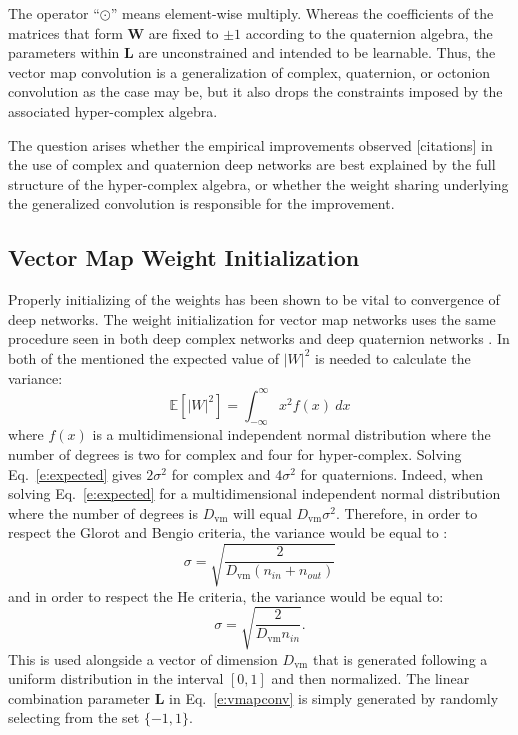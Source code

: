 \documentclass[14pt,a4paper]{article}
\begin{document}
\noindent
The operator ``$\odot$'' means element-wise multiply.
Whereas the coefficients of the matrices that form $\mathbf{W}$ are fixed to $\pm1$ according to the quaternion algebra,
the parameters within $\mathbf{L}$ are unconstrained and intended to be learnable.
Thus, the vector map convolution is a generalization of complex, quaternion, or octonion convolution as the case may be,
but it also drops the constraints imposed by the associated hyper-complex algebra.

The question arises whether the empirical improvements observed [citations] in the use of complex and quaternion deep networks are best explained by the full structure of the hyper-complex algebra, or whether the weight sharing underlying the generalized
convolution is responsible for the improvement.

\subsection{Vector Map Weight Initialization}
Properly initializing of the weights has been shown to be vital to convergence of deep networks.
The weight initialization for vector map networks uses the same procedure seen in both deep complex networks \cite{trabelsi+al-2018-complexconv} and deep quaternion networks \cite{Gaudet2018}.
In both of the mentioned the expected value of $|W|^2$ is needed to calculate the variance:
\begin{equation}
\mathbb{E}[|W|^2] = \int_{-\infty}^\infty x^2 f(x) ~dx
\label{e:expected}
\end{equation}
where $f(x)$ is a multidimensional independent normal distribution where the number of degrees is two for complex and four for hyper-complex.
Solving Eq.~\ref{e:expected} gives $2\sigma^2$ for complex and $4\sigma^2$ for quaternions.
Indeed, when solving Eq.~\ref{e:expected} for a multidimensional independent normal distribution where the number of degrees is $D_\mathrm{vm}$ will equal $D_\mathrm{vm}\sigma^2$.
Therefore, in order to respect the Glorot and Bengio \cite{glorot2010understanding} criteria, the variance would be equal to :
\begin{equation}
\sigma = \sqrt{\frac{2}{D_\mathrm{vm}(n_{in} + n_{out})}}
\label{e:vmap-glorot}
\end{equation}
and in order to respect the He \cite{he2015delving} criteria, the variance would be equal to:
\begin{equation}
\sigma = \sqrt{\frac{2}{D_\mathrm{vm}n_{in}}}.
\label{e:vmap-he}
\end{equation}
This is used alongside a vector of dimension $D_\mathrm{vm}$ that is generated following a uniform distribution in the interval $[0, 1]$ and then normalized. The linear combination parameter $\textbf{L}$ in Eq.~\ref{e:vmapconv} is simply generated by randomly selecting from the set  $\{-1, 1\}$.
\end{document}
